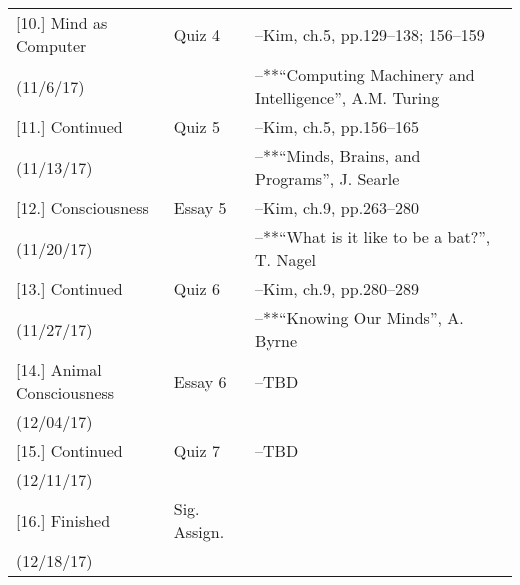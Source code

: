 \documentclass[article,oneside]{memoir}
\begin{document}
\begin{center}
\begin{longtable}{p{4.5cm}p{2cm}p{6cm}}
[10.] Mind as Computer		& Quiz 4			& --Kim, ch.5, pp.129--138; 156--159\\
(11/6/17)		            		&		      		& --**``Computing Machinery and Intelligence'', A.M. Turing  \\  [1.8\baselineskip]

[11.] Continued			    	& Quiz 5			& --Kim, ch.5, pp.156--165 \\
(11/13/17)				        &		    		& --**``Minds, Brains, and Programs'', J.  Searle \\ [1.8\baselineskip]
						
[12.] Consciousness		 	& Essay 5			& --Kim, ch.9, pp.263--280 \\
(11/20/17)				      	&			      	& --**``What is it like to be a bat?'', T. Nagel \\ [1.8\baselineskip]
 
[13.] Continued 	    		& Quiz 6			& --Kim, ch.9, pp.280--289\\
(11/27/17)			      		&			      	& --**``Knowing Our Minds'', A. Byrne  \\ [1.8\baselineskip]

[14.] Animal Consciousness  	 & Essay 6		& --TBD \\
(12/04/17)				      	&		      		&  \\ [1.8\baselineskip]

[15.] Continued		    		& Quiz 7			& --TBD \\ 
(12/11/17)				      	&			       	& \\ [1.8\baselineskip]

[16.] Finished		    		& Sig. Assign.		&  \\ 
(12/18/17)				      	&			       	& \\


\end{longtable}
\end{center}





\end{document}
